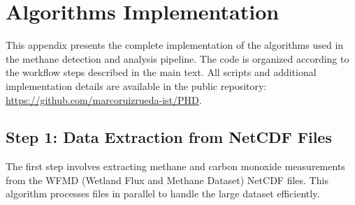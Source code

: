 \chapter{Algorithms Implementation}
\label{chapter:appendixB}

This appendix presents the complete implementation of the algorithms used in the methane detection and analysis pipeline. The code is organized according to the workflow steps described in the main text. All scripts and additional implementation details are available in the public repository: \url{https://github.com/marcoruizrueda-ist/PHD}.

\section{Step 1: Data Extraction from NetCDF Files}
\label{sec:appendixB_step1}

The first step involves extracting methane and carbon monoxide measurements from the WFMD (Wetland Flux and Methane Dataset) NetCDF files. This algorithm processes files in parallel to handle the large dataset efficiently.

